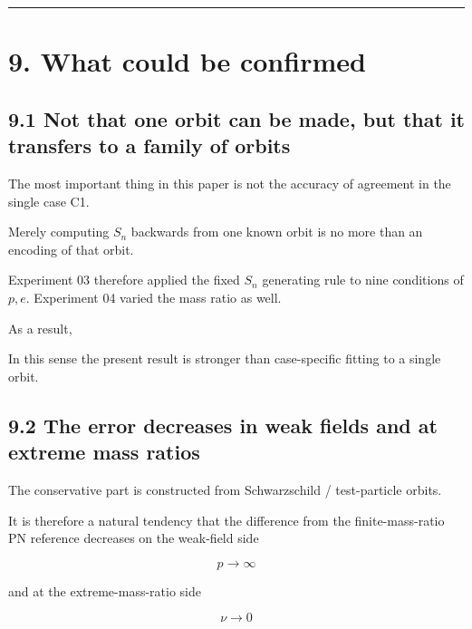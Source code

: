 \documentclass[
  a4paper,
]{article}
\begin{document}
\begin{center}\rule{0.5\linewidth}{0.5pt}\end{center}

\section{9. What could be confirmed}\label{what-could-be-confirmed}

\subsection{9.1 Not that one orbit can be made, but that it transfers to
a family of
orbits}\label{not-that-one-orbit-can-be-made-but-that-it-transfers-to-a-family-of-orbits}

The most important thing in this paper is not the accuracy of agreement
in the single case C1.

Merely computing \(S_n\) backwards from one known orbit is no more than
an encoding of that orbit.

Experiment 03 therefore applied the fixed \(S_n\) generating rule to
nine conditions of \(p,e\). Experiment 04 varied the mass ratio as well.

As a result,

\begin{center}
\end{center}

In this sense the present result is stronger than case-specific fitting
to a single orbit.

\subsection{9.2 The error decreases in weak fields and at extreme mass
ratios}\label{the-error-decreases-in-weak-fields-and-at-extreme-mass-ratios}

The conservative part is constructed from Schwarzschild / test-particle
orbits.

It is therefore a natural tendency that the difference from the
finite-mass-ratio PN reference decreases on the weak-field side

\[
p\rightarrow\infty
\]

and at the extreme-mass-ratio side

\[
\nu\rightarrow0
\]
\end{document}

